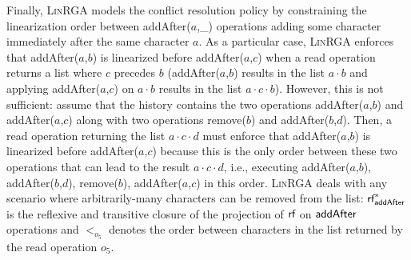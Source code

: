 Finally, \textsc{LinRGA} models the conflict resolution policy by constraining the linearization order between {\sf addAfter}($a$,\_) operations adding some character immediately after the same character $a$. As a particular case, \textsc{LinRGA} enforces that {\sf addAfter}($a$,$b$) is linearized before {\sf addAfter}($a$,$c$) when a {\sf read} operation returns a list where $c$ precedes $b$ ({\sf addAfter}($a$,$b$) results in the list $a\cdot b$ and applying {\sf addAfter}($a$,$c$) on $a\cdot b$ results in the list $a\cdot c\cdot b$). However, this is not sufficient: assume that the history contains the two operations {\sf addAfter}($a$,$b$) and {\sf addAfter}($a$,$c$) along with two operations {\sf remove}($b$) and {\sf addAfter}($b$,$d$). Then, a {\sf read} operation returning the list $a\cdot c\cdot d$ must enforce that {\sf addAfter}($a$,$b$) is linearized before {\sf addAfter}($a$,$c$) because this is the only order between these two operations that can lead to the result $a\cdot c\cdot d$, i.e., executing {\sf addAfter}($a$,$b$), {\sf addAfter}($b$,$d$), {\sf remove}($b$), {\sf addAfter}($a$,$c$) in this order. \textsc{LinRGA} deals with any scenario where arbitrarily-many characters can be removed from the list: $\textsf{rf}^*_{\sf addAfter}$ is the reflexive and transitive closure of the projection of $\textsf{rf}$ on ${\sf addAfter}$ operations and $<_{o_5}$ denotes the order between characters in the list returned by the {\sf read} operation $o_5$.


%
%


